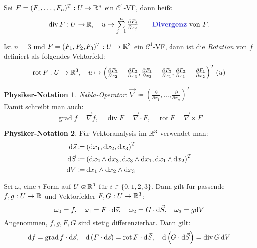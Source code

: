 \documentclass{cheat-sheet}
\DeclareMathOperator{\grad}{grad} %
\DeclareMathOperator{\divergence}{div} %
\DeclareMathOperator{\rot}{rot} %
\newcommand{\Cont}{\mathcal{C}} %
\theoremstyle{definition}
\newtheorem*{phnota}{Physiker-Notation}
\begin{document}
\begin{defn}
  Sei $F = (F_1, \ldots, F_n)^T : U \to \mathbb{R}^n$ ein $\Cont^1$-VF, dann heißt
  \[
    \divergence F : U \to \R, \quad u \mapsto \sum_{j=1}^n \tfrac{\partial F_j}{\partial x_j}
    \qquad \text{\emph{Divergenz} von $F$.}
  \]
\end{defn}

\begin{defn}
  Ist $n {=} 3$ und $F = (F_1, F_2, F_3)^T : U \to \mathbb{R}^3$ ein $\Cont^1$-VF, dann ist die \emph{Rotation} von $f$ definiert als folgendes Vektorfeld:
  \[
    \rot F : U \to \R^3, \quad
    u \mapsto \left(
      \tfrac{\partial F_3}{\partial x_2} - \tfrac{\partial F_2}{\partial x_3},
      \tfrac{\partial F_1}{\partial x_3} - \tfrac{\partial F_3}{\partial x_1},
      \tfrac{\partial F_2}{\partial x_1} - \tfrac{\partial F_1}{\partial x_2}
    \right)^T (u)
  \]
\end{defn}

\begin{phnota}
  \emph{Nabla-Operator}: $\vec{\nabla} \coloneqq \left( \tfrac{\partial}{\partial x_1}, \ldots, \tfrac{\partial}{\partial x_n} \right)^T$\\
  Damit schreibt man auch:
  \[
    \grad f = \vec{\nabla} f, \quad
    \divergence F = \vec{\nabla} \cdot F, \quad %
    \rot F = \vec{\nabla} \times F %
  \]
\end{phnota}

\begin{phnota}
  Für Vektoranalysis im $\mathbb{R}^3$ verwendet man:
  \begin{align*}
    \mathrm{d} \vec{s} &\coloneqq \left( \mathrm{d} x_1, \mathrm{d} x_2, \mathrm{d} x_3 \right)^T \\
    \mathrm{d} \vec{S} &\coloneqq \left( \mathrm{d} x_2 \wedge \mathrm{d} x_3, \mathrm{d} x_3 \wedge \mathrm{d} x_1, \mathrm{d} x_1 \wedge \mathrm{d} x_2 \right)^T \\
    \mathrm{d} V &\coloneqq \mathrm{d} x_1 \wedge \mathrm{d} x_2 \wedge \mathrm{d} x_3
  \end{align*}
\end{phnota}

\begin{bem}
  Sei $\omega_i$ eine $i$-Form auf $U \opn \R^3$ für $i \in \{ 0, 1, 2, 3 \}$. Dann gilt für passende $f, g : U \to \mathbb{R}$ und Vektorfelder $F, G : U \to \mathbb{R}^3$:
  \[
    \omega_0 = f, \quad
    \omega_1 = F \cdot \mathrm{d} \vec{s}, \quad
    \omega_2 = G \cdot \mathrm{d} \vec{S}, \quad
    \omega_3 = g \mathrm{d} V
  \]
  Angenommen, $f, g, F, G$ sind stetig differenzierbar. Dann gilt:
  \[
    \d f = \grad f \cdot \d \vec{s}, \quad
    \d \left(F \cdot \d \vec{s}\right) = \rot F \cdot \d \vec{S}, \quad
    \d \left(G \cdot \d \vec{S}\right) = \divergence G \, \d V
  \]
\end{bem}
\end{document}
